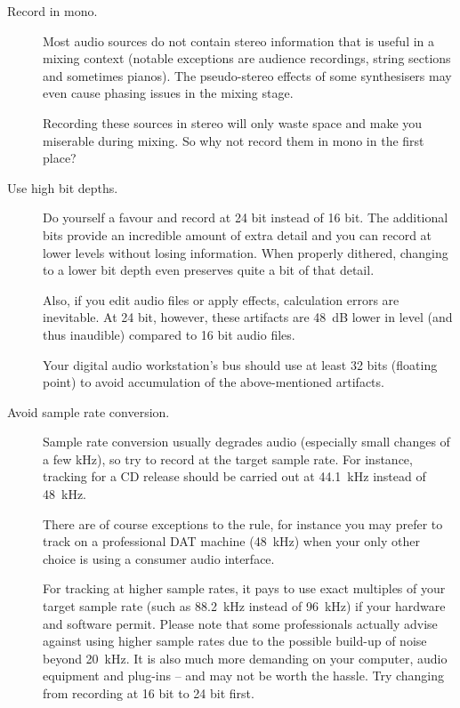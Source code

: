 \begin{description}
\item[Record in mono.]  Most audio sources do not contain stereo
  information that is useful in a mixing context (notable exceptions
  are audience recordings, string sections and sometimes pianos).  The
  pseudo-stereo effects of some synthesisers may even cause phasing
  issues in the mixing stage.

  Recording these sources in stereo will only waste space and make you
  miserable during mixing.  So why not record them in mono in the
  first place?

\item[Use high bit depths.]  Do yourself a favour and record at 24 bit
  instead of 16 bit.  The additional bits provide an incredible amount
  of extra detail and you can record at lower levels without losing
  information.  When properly dithered, changing to a lower bit depth
  even preserves quite a bit of that detail.

  Also, if you edit audio files or apply effects, calculation errors
  are inevitable.  At 24 bit, however, these artifacts are
  \SI{48}{\dB} lower in level (and thus inaudible) compared to 16 bit
  audio files.

  Your digital audio workstation's bus should use at least 32 bits
  (floating point) to avoid accumulation of the above-mentioned
  artifacts.

\item[Avoid sample rate conversion.]  Sample rate conversion usually
  degrades audio (especially small changes of a few \si{\kilo\hertz}),
  so try to record at the target sample rate.  For instance, tracking
  for a CD release should be carried out at \SI{44.1}{\kilo\hertz}
  instead of \SI{48}{\kilo\hertz}.

  There are of course exceptions to the rule, for instance you may
  prefer to track on a professional DAT machine (\SI{48}{\kilo\hertz})
  when your only other choice is using a consumer audio interface.

  For tracking at higher sample rates, it pays to use exact multiples
  of your target sample rate (such as \SI{88.2}{\kilo\hertz} instead
  of \SI{96}{\kilo\hertz}) if your hardware and software permit.
  Please note that some professionals actually advise against using
  higher sample rates due to the possible build-up of noise beyond
  \SI{20}{\kilo\hertz}.  It is also much more demanding on your
  computer, audio equipment and plug-ins -- and may not be worth the
  hassle.  Try changing from recording at 16 bit to 24 bit first.


\end{description}
